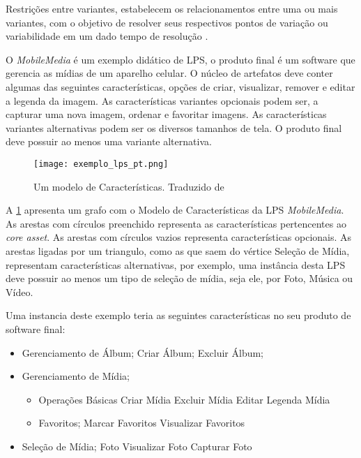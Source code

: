 Restrições entre variantes, estabelecem os relacionamentos entre uma ou mais variantes, com o objetivo de resolver seus respectivos pontos de variação ou variabilidade em um dado tempo de resolução \cite{halmans2003communicating}.

O \textit{MobileMedia} é um exemplo didático de LPS, o produto final é um software que gerencia as mídias de um aparelho celular. O núcleo de artefatos deve conter algumas das seguintes características, opções de criar, visualizar, remover e editar a legenda da imagem. As características variantes opcionais podem ser, a capturar uma nova imagem, ordenar e favoritar imagens. As características variantes alternativas podem ser os diversos tamanhos de tela. O produto final deve possuir ao menos uma variante alternativa.

\begin{figure}[htb]
	\centering					
	{\texttt{[image: exemplo\_lps\_pt.png]}}
	
	\caption{Um modelo de Características. Traduzido de \citet{sommerville2011software} }
	\label{fig:exemplo-lps}
\end{figure}

A \ref{fig:exemplo-lps} apresenta um grafo com o Modelo de Características da LPS \textit{MobileMedia}. As arestas com círculos preenchido representa as características pertencentes ao \textit{core asset}. As arestas com círculos vazios representa características opcionais. As arestas ligadas por um triangulo, como as que saem do vértice Seleção de Mídia, representam características alternativas, por exemplo, uma instância desta LPS deve possuir ao menos um tipo de seleção de mídia, seja ele, por Foto, Música ou Vídeo. 

Uma instancia deste exemplo teria as seguintes características no seu produto de software final:
\begin{itemize}
	\item Gerenciamento de Álbum; 
	\subitem Criar Álbum;
	\subitem Excluir Álbum;
	\item Gerenciamento de Mídia;
	\begin{itemize}
		\item Operações Básicas
		\subitem Criar Mídia
		\subitem Excluir Mídia
		\subitem Editar Legenda Mídia			
		\item Favoritos;
		\subitem Marcar Favoritos
		\subitem Visualizar Favoritos			
	\end{itemize}
	\item Seleção de Mídia;
	\subitem Foto
	\subitem Visualizar Foto
	\subitem Capturar Foto			
\end{itemize}

